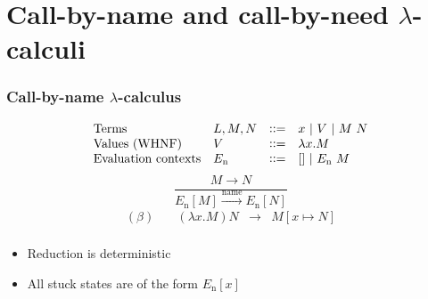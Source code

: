 \documentclass[dvipdfmx,cjk,xcolor=dvipsnames,envcountsect,notheorems,12pt]{beamer}
\theoremstyle{definition}
\newcommand{\CALLBYNAME}{\xrightarrow{\mathrm{name}}}
\begin{document}
\section{Call-by-name and call-by-need $\lambda$-calculi}

\begin{frame}
	\frametitle{Call-by-name $\lambda$-calculus}
	\large
	\vspace{-5mm}
	\[ \begin{array}{llcl}
		\mbox{Terms} & L,M,N & \vcentcolon\vcentcolon= & x~|~V~|~M~N \\
		\mbox{Values (WHNF)} & V & \vcentcolon\vcentcolon= & \lambda x.M \\
		\mbox{Evaluation contexts} & E_\mathrm{n} & \vcentcolon\vcentcolon= & [] ~|~ E_\mathrm{n}~M \\
	\end{array} \]
	\vfill
	\[\frac{M \rightarrow N}{E_\mathrm{n}[M] \CALLBYNAME E_\mathrm{n}[N]}\]
	\vfill
	\[ \begin{array}{lrcl}
		(\beta)\quad & (\lambda x.M)N & \rightarrow & M[x \mapsto N] \\
	\end{array} \]
	\vspace{-5mm}
	\begin{itemize}
		\item Reduction is deterministic
		\item All stuck states are of the form $E_\mathrm{n}[x]$
	\end{itemize}
\end{frame}
\end{document}
